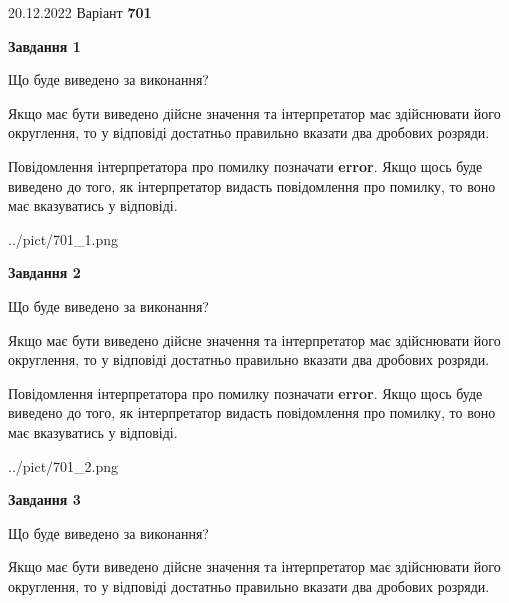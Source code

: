 \documentclass[12pt, ukrainian]{article}
\begin{document}
{20.12.2022 Варіант \No \textbf { 701 }\par}
{
\begin {Large}

{\begin {center}\textbf{Завдання 1}\end {center}}\par
Що буде виведено за виконання? \par

Якщо має бути виведено дійсне значення та інтерпретатор має здійснювати його округлення, 
то у відповіді достатньо правильно вказати два дробових розряди.

Повідомлення інтерпретатора про помилку позначати \textbf{error}.
Якщо щось буде виведено до того, як інтерпретатор видасть повідомлення про помилку, 
то воно має вказуватись у відповіді. \par

\begin{center}
	{../pict/701_1.png}
\end{center}
\newpage

{\begin {center}\textbf{Завдання 2}\end {center}}\par
Що буде виведено за виконання? \par

Якщо має бути виведено дійсне значення та інтерпретатор має здійснювати його округлення, 
то у відповіді достатньо правильно вказати два дробових розряди.

Повідомлення інтерпретатора про помилку позначати \textbf{error}.
Якщо щось буде виведено до того, як інтерпретатор видасть повідомлення про помилку, 
то воно має вказуватись у відповіді. \par

\begin{center}
	{../pict/701_2.png}
\end{center}
\newpage

{\begin {center}\textbf{Завдання 3}\end {center}}\par
Що буде виведено за виконання? \par

Якщо має бути виведено дійсне значення та інтерпретатор має здійснювати його округлення, 
то у відповіді достатньо правильно вказати два дробових розряди.


\end{Large}}
\end{document}
